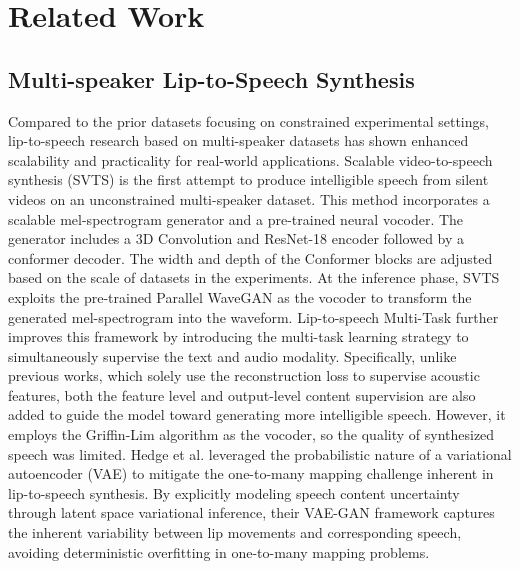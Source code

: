 \section{Related Work}
\subsection{Multi-speaker Lip-to-Speech Synthesis}
Compared to the prior datasets focusing on constrained experimental settings, lip-to-speech research based on multi-speaker datasets has shown enhanced scalability and practicality for real-world applications. Scalable video-to-speech synthesis (SVTS) \cite{schoburgcarrillodemira2022} is the first attempt to produce intelligible speech from silent videos on an unconstrained multi-speaker dataset. This method incorporates a scalable mel-spectrogram generator and a pre-trained neural vocoder. The generator includes a 3D Convolution and ResNet-18\cite{he2016deep} encoder followed by a conformer\cite{gulati2020conformer} decoder. The width and depth of the Conformer blocks are adjusted based on the scale of datasets in the experiments. At the inference phase, SVTS exploits the pre-trained Parallel WaveGAN\cite{yamamoto2020parallel} as the vocoder to transform the generated mel-spectrogram into the waveform. Lip-to-speech Multi-Task\cite{kim2023-liptospeech} further improves this framework by introducing the multi-task learning strategy to simultaneously supervise the text and audio modality. Specifically, unlike previous works, which solely use the reconstruction loss to supervise acoustic features, both the feature level and output-level content supervision are also added to guide the model toward generating more intelligible speech. However, it employs the Griffin-Lim algorithm as the vocoder, so the quality of synthesized speech was limited. Hedge et al. \cite{hegde2022} leveraged the probabilistic nature of a variational autoencoder (VAE) to mitigate the one-to-many mapping challenge inherent in lip-to-speech synthesis. By explicitly modeling speech content uncertainty through latent space variational inference, their VAE-GAN framework captures the inherent variability between lip movements and corresponding speech, avoiding deterministic overfitting in one-to-many mapping problems.

